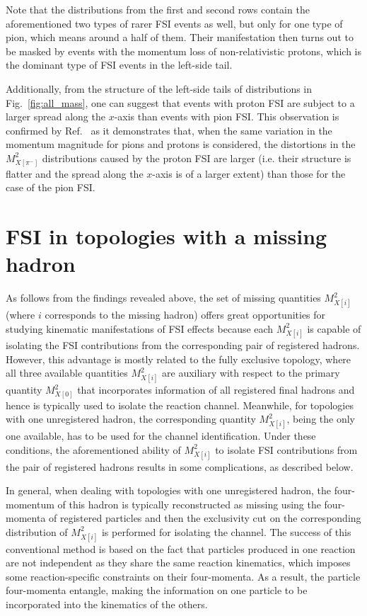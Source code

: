 Note that the distributions from the first and second rows contain the aforementioned two types of rarer FSI events as well, but only for one type of pion, which means around a half of them. Their manifestation then turns out to be masked by events with the momentum loss of non-relativistic protons, which is the dominant type of FSI events in the left-side tail.


Additionally, from the structure of the left-side tails of distributions in Fig.~\ref{fig:all_mass}, one can suggest that events with proton FSI are subject to a larger spread along the $x$-axis than events with pion FSI. This observation is confirmed by Ref.~\cite{note_mm_distr} as it demonstrates that, when the same variation in the momentum magnitude for pions and protons is considered, the distortions in the $M^{2}_{X[\pi^{-}]}$ distributions caused by the proton FSI are larger (i.e. their structure is flatter and the spread along the $x$-axis is of a larger extent) than those for the case of the pion FSI.


\newpage

\section{FSI in topologies with a missing hadron}


As follows from the findings revealed above, the set of missing quantities $M^{2}_{X[i]}$ (where $i$ corresponds to the missing hadron) offers great opportunities for studying kinematic manifestations of FSI effects because each $M^{2}_{X[i]}$ is capable of isolating the FSI contributions from the corresponding pair of registered hadrons. However, this advantage is mostly related to the fully exclusive topology, where all three available quantities $M^{2}_{X[i]}$ are auxiliary with respect to the primary quantity $M^{2}_{X[0]}$ that incorporates information of all registered final hadrons and hence is typically used to isolate the reaction channel. Meanwhile, for topologies with one unregistered hadron, the corresponding quantity $M^{2}_{X[i]}$, being the only one available, has to be used for the channel identification. Under these conditions, the aforementioned ability of $M^{2}_{X[i]}$ to isolate FSI contributions from the pair of registered hadrons results in some complications, as described below.


In general, when dealing with topologies with one unregistered hadron, the four-momentum of this hadron is typically reconstructed as missing using the four-momenta of registered particles and then the exclusivity cut on the corresponding distribution of $M^{2}_{X[i]}$ is performed for isolating the channel. The success of this conventional method is based on the fact that particles produced in one reaction are not independent as they share the same reaction kinematics, which imposes some reaction-specific constraints on their four-momenta. As a result, the particle four-momenta entangle, making the information on one particle to be incorporated into the kinematics of the others. 


